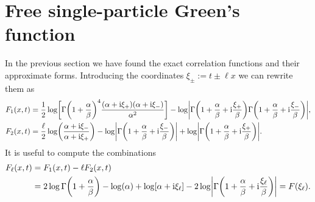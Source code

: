 \documentclass[english, parskip=full]{scrartcl}
\begin{document}
\section{Free single-particle Green's function}
In the previous section we have found the exact correlation functions and their approximate forms.
Introducing the coordinates $\xi_\pm := t \pm \ell x$ we can rewrite them as
\begin{align}
F_1(x,t) &= \frac{1}{2} \log \klb[\bigg]{ \Gamma\kla*{1 + \frac{\alpha}{\beta}}^4 \frac{\kla*{\alpha + \i \xi_+} \kla*{\alpha + \i \xi_-}}{\alpha^2}} - \log \abs*{\Gamma\kla*{1 + \frac{\alpha}{\beta} + \i \frac{\xi_+}{\beta}} \Gamma\kla*{1 + \frac{\alpha}{\beta} + \i \frac{\xi_-}{\beta}}},\\
F_2(x,t) &= \frac{\ell}{2} \log\kla*{\frac{\alpha + \i\xi_-}{\alpha + \i\xi_+}} - \log \abs*{\Gamma\kla*{1 + \frac{\alpha}{\beta} + \i \frac{\xi_-}{\beta}}} + \log \abs*{\Gamma\kla*{1 + \frac{\alpha}{\beta} + \i \frac{\xi_+}{\beta}}}.
\end{align}
It is useful to compute the combinations
\begin{align}
F_\ell(x,t) &= F_1(x,t) - \ell F_2(x,t) \\
&= 2\log\Gamma\kla*{1 + \frac{\alpha}{\beta}} - \log(\alpha) + \log\klb*{\alpha + \i\xi_\ell} - 2\log \abs*{\Gamma\kla*{1 + \frac{\alpha}{\beta} + \i \frac{\xi_\ell}{\beta}}} = F(\xi_\ell).
\end{align}
\end{document}
